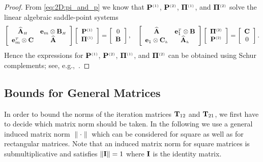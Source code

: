 \begin{proof}
From \eqref{eq:2D:pi_and_p} we know that $\mathbf{P}^{\scriptscriptstyle (1)}$, $\mathbf{P}^{\scriptscriptstyle (2)}$, $\mathbf{\Pi}^{\scriptscriptstyle (1)}$, and
$\mathbf{\Pi}^{\scriptscriptstyle (2)}$ solve the linear algebraic saddle-point systems
%
\begin{equation}%
\left[
\begin{array}{cc}
        \matAHhat         & \e_{m} \otimes \matBH \\
\e_{m}^{\Tr} \otimes \matC & \matA
\end{array}
\right]
\left[
\begin{array}{c}
\POne \\
\PiOne
\end{array}
\right]=
\left[
\begin{array}{c}
    0 \\
 \matB
\end{array}
\right],
\quad
\left[
\begin{array}{cc}
        \matA          & \e_{1}^{\Tr} \otimes \matB \\
 \e_{1} \otimes \matCh  &  \matAhhat
\end{array}
\right]
\left[
\begin{array}{c}
\PiTwo \\
\PTwo
\end{array}
\right]
= \left[
\begin{array}{c}
\matC \\
 0
\end{array}
\right].\nonumber
\end{equation}
%
Hence the expressions for  $\mathbf{P}^{\scriptscriptstyle (1)}$, $\mathbf{P}^{\scriptscriptstyle (2)}$, $\mathbf{\Pi}^{\scriptscriptstyle (1)}$, and $\mathbf{\Pi}^{\scriptscriptstyle (2)}$ can be
obtained using Schur complements; see, e.g.,~\cite[\S~0.7.3]{HorJoh12}.
\end{proof}

\subsection{Bounds for General Matrices}
\label{2D:bounds:convergence}
In order to bound the norms of the iteration matrices $\mathbf{T}_{12}$ and $\mathbf{T}_{21}$,
we first have to decide which matrix norm should be taken. In the following we
use a general induced matrix norm $\|\cdot\|$ which can be considered
for square as well as for rectangular matrices. Note that an induced matrix
norm for square matrices is submultiplicative and satisfies $\|\mathbf{I}\|=1$ where
$\mathbf{I}$ is the identity matrix.

